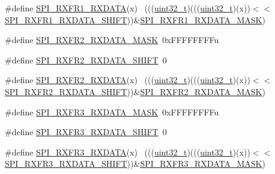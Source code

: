 \begin{DoxyCompactItemize}
\#define \hyperlink{group___s_p_i___register___masks_ga5b60ccd0f9298455decd8c152935d598}{S\+P\+I\+\_\+\+R\+X\+F\+R1\+\_\+\+R\+X\+D\+A\+TA}(x)                                        ~(((\hyperlink{_p_e___types_8h_a33594304e786b158f3fb30289278f5af}{uint32\+\_\+t})(((\hyperlink{_p_e___types_8h_a33594304e786b158f3fb30289278f5af}{uint32\+\_\+t})(x))$<$$<$\hyperlink{group___s_p_i___register___masks_gab6747e932cee7cbdab3b46213f8d793b}{S\+P\+I\+\_\+\+R\+X\+F\+R1\+\_\+\+R\+X\+D\+A\+T\+A\+\_\+\+S\+H\+I\+FT}))\&\hyperlink{group___s_p_i___register___masks_gae5778ef350adb171937498b1b49ffdb0}{S\+P\+I\+\_\+\+R\+X\+F\+R1\+\_\+\+R\+X\+D\+A\+T\+A\+\_\+\+M\+A\+SK})
\item 
\#define \hyperlink{group___s_p_i___register___masks_ga659737d6e82c6f3ace0e1d568157426f}{S\+P\+I\+\_\+\+R\+X\+F\+R2\+\_\+\+R\+X\+D\+A\+T\+A\+\_\+\+M\+A\+SK}~0x\+F\+F\+F\+F\+F\+F\+F\+Fu
\item 
\#define \hyperlink{group___s_p_i___register___masks_gac8d903abae42a6b97dcbdc5bf31b1276}{S\+P\+I\+\_\+\+R\+X\+F\+R2\+\_\+\+R\+X\+D\+A\+T\+A\+\_\+\+S\+H\+I\+FT}~0
\item 
\#define \hyperlink{group___s_p_i___register___masks_gabc8371b1dd143af63fe02d90a5955a8f}{S\+P\+I\+\_\+\+R\+X\+F\+R2\+\_\+\+R\+X\+D\+A\+TA}(x)                                        ~(((\hyperlink{_p_e___types_8h_a33594304e786b158f3fb30289278f5af}{uint32\+\_\+t})(((\hyperlink{_p_e___types_8h_a33594304e786b158f3fb30289278f5af}{uint32\+\_\+t})(x))$<$$<$\hyperlink{group___s_p_i___register___masks_gac8d903abae42a6b97dcbdc5bf31b1276}{S\+P\+I\+\_\+\+R\+X\+F\+R2\+\_\+\+R\+X\+D\+A\+T\+A\+\_\+\+S\+H\+I\+FT}))\&\hyperlink{group___s_p_i___register___masks_ga659737d6e82c6f3ace0e1d568157426f}{S\+P\+I\+\_\+\+R\+X\+F\+R2\+\_\+\+R\+X\+D\+A\+T\+A\+\_\+\+M\+A\+SK})
\item 
\#define \hyperlink{group___s_p_i___register___masks_ga06579b6d579b820152dd81435d71c09e}{S\+P\+I\+\_\+\+R\+X\+F\+R3\+\_\+\+R\+X\+D\+A\+T\+A\+\_\+\+M\+A\+SK}~0x\+F\+F\+F\+F\+F\+F\+F\+Fu
\item 
\#define \hyperlink{group___s_p_i___register___masks_gaae4c2a3c38669f7a03fbcaabd29de0c7}{S\+P\+I\+\_\+\+R\+X\+F\+R3\+\_\+\+R\+X\+D\+A\+T\+A\+\_\+\+S\+H\+I\+FT}~0
\item 
\#define \hyperlink{group___s_p_i___register___masks_ga8c7e9deb3b65a9c53481ba16d8e6549d}{S\+P\+I\+\_\+\+R\+X\+F\+R3\+\_\+\+R\+X\+D\+A\+TA}(x)                                        ~(((\hyperlink{_p_e___types_8h_a33594304e786b158f3fb30289278f5af}{uint32\+\_\+t})(((\hyperlink{_p_e___types_8h_a33594304e786b158f3fb30289278f5af}{uint32\+\_\+t})(x))$<$$<$\hyperlink{group___s_p_i___register___masks_gaae4c2a3c38669f7a03fbcaabd29de0c7}{S\+P\+I\+\_\+\+R\+X\+F\+R3\+\_\+\+R\+X\+D\+A\+T\+A\+\_\+\+S\+H\+I\+FT}))\&\hyperlink{group___s_p_i___register___masks_ga06579b6d579b820152dd81435d71c09e}{S\+P\+I\+\_\+\+R\+X\+F\+R3\+\_\+\+R\+X\+D\+A\+T\+A\+\_\+\+M\+A\+SK})
\end{DoxyCompactItemize}


